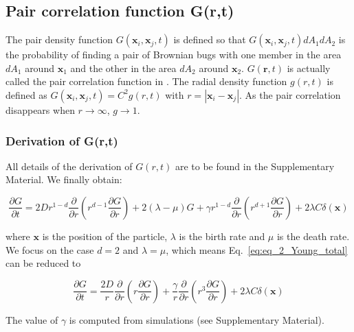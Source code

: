 \subsection*{Pair correlation function G(r,t)}

The pair density function $G(\boldsymbol{x}_i,\boldsymbol{x}_j,t)$ is defined so that $G(\boldsymbol{x}_i,\boldsymbol{x}_j,t)dA_1dA_2$ is the probability of finding a pair of Brownian bugs with one member in the area $dA_1$ around $\boldsymbol{x}_1$ and the other in the area $dA_2$ around $\boldsymbol{x}_2$. $G(\boldsymbol{r},t)$ is actually called the pair correlation function in \cite{young_reproductive_2001}. The radial density function $g(r,t)$ is defined as $G(\boldsymbol{x}_i,\boldsymbol{x}_j,t)=C^2g(r,t)$ with $r=|\boldsymbol{x}_i-\boldsymbol{x}_j|$. As the pair correlation disappears when $r\rightarrow\infty$, $g\rightarrow 1$. \\

\subsubsection*{Derivation of G(r,t)}

All details of the derivation of $G(r,t)$ are to be found in the Supplementary Material. We finally obtain:

\begin{equation}
\frac{\partial G}{\partial t}=2Dr^{1-d}\frac{\partial}{\partial r}\left(r^{d-1}\frac{\partial G}{\partial r}\right)+2(\lambda-\mu)G+\gamma r^{1-d}\frac{\partial}{\partial r}\left(r^{d+1}\frac{\partial G}{\partial r}\right)+2\lambda C\delta(\boldsymbol{x})\label{eq:eq_2_Young_total}
\end{equation}

where $\boldsymbol{x}$ is the position of the particle, $\lambda$ is the birth rate and $\mu$ is the death rate. \\

We focus on the case $d=2$ and $\lambda=\mu$, which means Eq.~\ref{eq:eq_2_Young_total} can be reduced to

\begin{equation}
\frac{\partial G}{\partial t}=\frac{2D}{r}\frac{\partial}{\partial r}\left(r\frac{\partial G}{\partial r}\right)+\frac{\gamma}{r}\frac{\partial}{\partial r}\left(r^{3}\frac{\partial G}{\partial r}\right)+2\lambda C\delta(\boldsymbol{x})\label{eq:eq_2_Young_reduced}
\end{equation}

The value of $\gamma$ is computed from simulations (see Supplementary Material).

